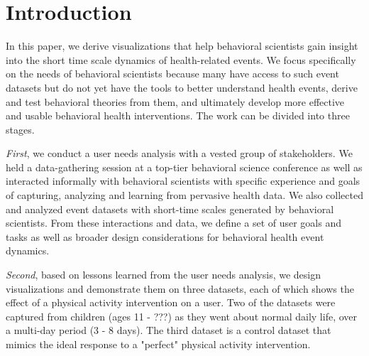 
\section{Introduction} %



In this paper, we derive visualizations that help behavioral scientists gain insight into the short time scale dynamics of health-related events. We focus specifically on the needs of behavioral scientists because many have access to such event datasets but do not yet have the tools to better understand health events, derive and test behavioral theories from them, and ultimately develop more effective and usable behavioral health interventions. The work can be divided into three stages.

\textit{First}, we conduct a user needs analysis with a vested group of stakeholders. We held a data-gathering session at a top-tier behavioral science conference as well as interacted informally with behavioral scientists with specific experience and goals of capturing, analyzing and learning from pervasive health data. We also collected  and analyzed event datasets with short-time scales generated by behavioral scientists. From these interactions and data, we define a set of user goals and tasks as well as broader design considerations for behavioral health event dynamics.  

\textit{Second}, based on lessons learned from the user needs analysis, we design visualizations and demonstrate them on three datasets, each of which shows the effect of a physical activity intervention on a user. Two of the datasets were captured from children (ages 11 - ???) as they went about normal daily life, over a multi-day period (3 - 8 days).  The third dataset is a control dataset that mimics the ideal response to a "perfect" physical activity intervention.  

